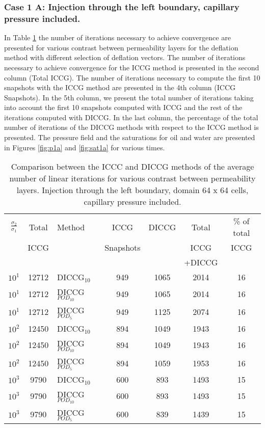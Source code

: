 \documentclass[12pt]{article}
\begin{document}
\subsubsection*{Case 1 A: Injection through the left boundary, capillary pressure included.}
In Table \ref{table:liter1a} the number of iterations necessary to achieve convergence are presented for various contrast between permeability layers for the deflation method with different selection of deflation vectors. The number of iterations necessary to achieve convergence for the ICCG method is presented in the second column (Total ICCG). The number of iterations necessary to compute the first 10 snapshots with the ICCG method are presented in the 4th column (ICCG Snapshots). In the 5th column, we present the total number of iterations taking into account the first 10 snapshots computed with ICCG and the rest of the iterations computed with DICCG. In the last column, the percentage of the total number of iterations of the DICCG methods with respect to the ICCG method is presented.   
The pressure field and the saturations for oil and water are presented in Figures \ref{fig:p1a} and \ref{fig:sat1a} for various times.
\begin{table}[!h]\centering
\begin{minipage}{1\textwidth}
 \centering
\begin{tabular}{ ||c|c||l|c|c|c|c||} 
\hline
$\frac{\sigma_2}{\sigma_1}$&Total&Method  & ICCG&DICCG &Total&\% of total\\ 
                           & ICCG     &  & Snapshots& &ICCG& ICCG\\ 
                            &     &  & & &+DICCG& \\
\hline 
$10^{1}$ &12712& DICCG$_{10}$&949&1065&2014&16\\ 
\hline  
$10^{1}$ &12712& DICCG$_{POD_{10}}$&949&1065&2014&16 \\ 
\hline  
$10^{1}$ &12712& DICCG$_{POD_{5}}$&949&1125&2074&16 \\ 
\hline  
$10^{2}$ &12450& DICCG$_{10}$&894&1049&1943&16\\ 
\hline  
$10^{2}$ &12450& DICCG$_{POD_{10}}$&894&1049&1943&16 \\ 
\hline  
$10^{2}$ &12450& DICCG$_{POD_{5}}$&894&1059&1953&16 \\ 
\hline  
$10^{3}$ &9790& DICCG$_{10}$&600&893&1493&15\\ 
\hline  
$10^{3}$ &9790& DICCG$_{POD_{10}}$&600&893&1493&15 \\ 
\hline  
$10^{3}$ &9790& DICCG$_{POD_{5}}$&600&839&1439&15 \\ 
\hline
\end{tabular} 
\caption{Comparison between the ICCC and DICCG methods of the average number of linear iterations for various contrast between permeability layers. Injection through the left boundary, domain 64 x 64 cells, capillary pressure included.}\label{table:liter1a} 
\end{minipage}  
\end{table}  
\end{document}
